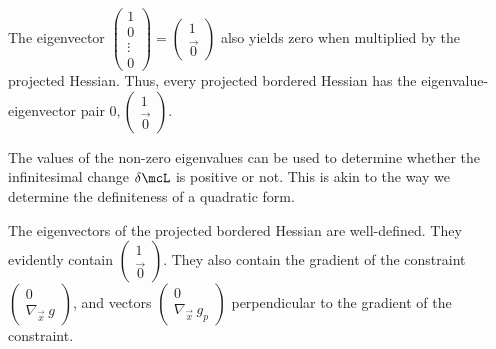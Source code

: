 \documentclass[a4paper, 12pt,oneside,openany]{book}
\begin{document}
The eigenvector $\begin{pmatrix}1 \\ 0 \\ \vdots \\ 0 \end{pmatrix} = \begin{pmatrix} 1 \\ \vec{0} \end{pmatrix}$ also yields zero when multiplied by the projected Hessian. Thus, every projected bordered Hessian has the eigenvalue-eigenvector pair $0, \begin{pmatrix} 1 \\ \vec{0} \end{pmatrix}$.

The values of the non-zero eigenvalues can be used to determine whether the infinitesimal change $\delta \mcL$ is positive or not. This is akin to the way we determine the definiteness of a quadratic form.

The eigenvectors of the projected bordered Hessian are well-defined. They evidently contain $\begin{pmatrix} 1 \\ \vec{0} \end{pmatrix}$. They also contain the gradient of the constraint $\begin{pmatrix} 0 \\ \nabla_{\vec{x}}\ g \end{pmatrix}$, and vectors $\begin{pmatrix} 0 \\ \nabla_{\vec{x}}\ g_p \end{pmatrix}$ perpendicular to the gradient of the constraint.
\end{document}
